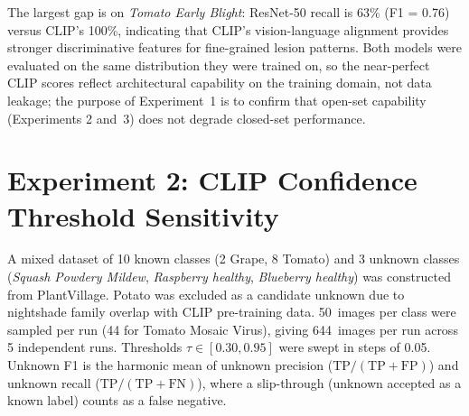 The largest gap is on \textit{Tomato Early Blight}: ResNet-50 recall is 63\%
(F1 = 0.76) versus CLIP's 100\%, indicating that CLIP's vision-language
alignment provides stronger discriminative features for fine-grained lesion
patterns.
Both models were evaluated on the same distribution they were trained on,
so the near-perfect CLIP scores reflect architectural capability on the
training domain, not data leakage; the purpose of Experiment~1 is to confirm
that open-set capability (Experiments 2 and~3) does not degrade closed-set
performance.


\section{Experiment 2: CLIP Confidence Threshold Sensitivity}
\label{sec:exp2}

A mixed dataset of 10 known classes (2 Grape, 8 Tomato) and 3 unknown classes
(\textit{Squash Powdery Mildew}, \textit{Raspberry healthy},
\textit{Blueberry healthy}) was constructed from PlantVillage.
Potato was excluded as a candidate unknown due to nightshade family overlap
with CLIP pre-training data.
50~images per class were sampled per run (44 for Tomato Mosaic Virus),
giving 644~images per run across 5 independent runs.
Thresholds $\tau \in [0.30, 0.95]$ were swept in steps of 0.05.
Unknown F1 is the harmonic mean of unknown precision
($\text{TP}/(\text{TP}+\text{FP})$) and unknown recall
($\text{TP}/(\text{TP}+\text{FN})$), where a slip-through (unknown accepted
as a known label) counts as a false negative.

